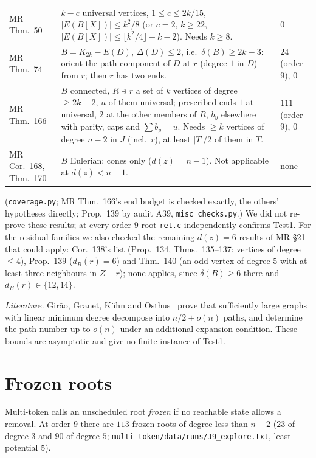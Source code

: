 \documentclass[11pt]{amsart}
\theoremstyle{definition}
\begin{document}
\begin{center}
\begin{tabular}{@{}>{\raggedright\arraybackslash}p{}>{\raggedright\arraybackslash}p{}>{\raggedright\arraybackslash}p{}@{}}
MR Thm.~50 & $k-c$ universal vertices, $1\le c\le 2k/15$, $|E(B[X])|\le k^2/8$ (or $c=2$, $k\ge22$,
$|E(B[X])|\le\lfloor k^2/4\rfloor-k-2$). Needs $k\ge8$. & $0$\\
MR Thm.~74 & $B=K_{2k}-E(D)$, $\Delta(D)\le2$, i.e.\ $\delta(B)\ge2k-3$: orient the path component of
$D$ at $r$ (degree $1$ in $D$) from $r$; then $r$ has two ends. & $24$ (order 9), $0$\\
MR Thm.~166 & $B$ connected, $R\ni r$ a set of $k$ vertices of degree $\ge2k-2$, $u$ of them universal;
prescribed ends $1$ at universal, $2$ at the other members of $R$, $b_y$ elsewhere with parity, caps and
$\sum b_y=u$. Needs $\ge k$ vertices of degree $n-2$ in $J$ (incl.\ $r$), at least $|T|/2$ of them in
$T$. & $111$ (order 9), $0$\\
MR Cor.~168, Thm.~170 & $B$ Eulerian: cones only ($d(z)=n-1$). Not applicable at $d(z)<n-1$. & none\\
\bottomrule
\end{tabular}
\end{center}
(\texttt{coverage.py}; MR Thm.~166's end budget is checked exactly, the others' hypotheses directly;
Prop.~139 by audit A39, \texttt{misc\_checks.py}.) We did not re-prove these results; at every order-$9$
root \texttt{ret.c} independently confirms Test1. For the residual families we also checked the
remaining $d(z)=6$ results of MR \S21 that could apply: Cor.~138's list (Prop.~134, Thms.~135--137:
vertices of degree $\le4$), Prop.~139 ($d_B(r)=6$) and Thm.~140 (an odd vertex of degree $5$ with at least
three neighbours in $Z-r$); none applies, since $\delta(B)\ge6$ there and $d_B(r)\in\{12,14\}$.

\emph{Literature.} Girão, Granet, Kühn and Osthus~\cite{GGKO} prove that sufficiently large graphs with
linear minimum degree decompose into $n/2+o(n)$ paths, and determine the path number up to $o(n)$ under
an additional expansion condition. These bounds are asymptotic and give no finite instance of Test1.

\section{Frozen roots}\label{sec:frozen}

Multi-token calls an unscheduled root \emph{frozen} if no reachable state allows a removal. At order $9$
there are $113$ frozen roots of degree less than $n-2$ ($23$ of degree $3$ and $90$ of degree $5$;
\texttt{multi-token/data/runs/J9\_explore.txt}, least potential $5$).
\end{document}
